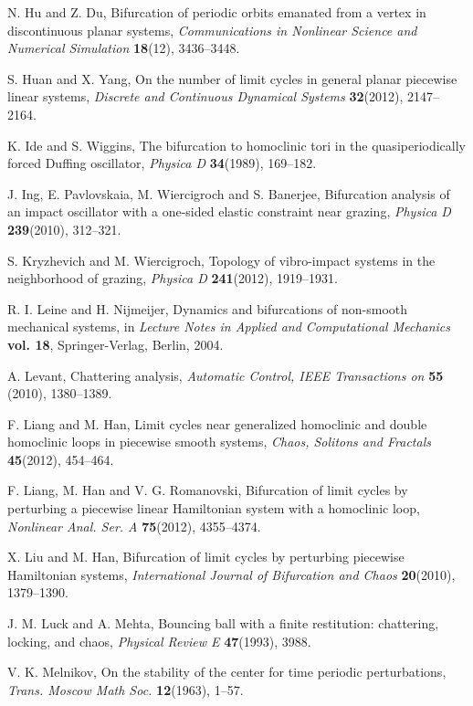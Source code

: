 \documentclass[12pt,openany,CJK,oneside]{cctbook}
\begin{document}
{{\begin{thebibliography}{999}
 N. Hu and Z. Du, Bifurcation of periodic orbits emanated from a vertex in discontinuous planar systems, {\it Communications in Nonlinear Science and Numerical Simulation} {\bf 18}(12), 3436--3448.

S. Huan and X. Yang, On the number of limit cycles in general planar piecewise linear systems, {\it Discrete and Continuous Dynamical Systems} {\bf 32}(2012), 2147--2164.

 K. Ide and S. Wiggins, The bifurcation to homoclinic tori in the quasiperiodically forced
Duffing oscillator, {\it Physica D} {\bf 34}(1989), 169--182.

 J. Ing, E. Pavlovskaia, M. Wiercigroch and S. Banerjee, Bifurcation analysis of an impact
oscillator with a one-sided elastic constraint near grazing, {\it Physica D} {\bf 239}(2010), 312--321.

 S. Kryzhevich and M. Wiercigroch, Topology of vibro-impact systems in the neighborhood of grazing,
{\it Physica D} {\bf 241}(2012), 1919--1931.

  R. I. Leine and H. Nijmeijer, Dynamics and bifurcations of non-smooth mechanical systems, in {\it Lecture Notes in Applied and Computational Mechanics} {\bf vol. 18}, Springer-Verlag, Berlin, 2004.

A. Levant, Chattering analysis, {\it Automatic Control, IEEE Transactions on} {\bf 55} (2010), 1380--1389.

F. Liang and M. Han, Limit cycles near generalized homoclinic and double homoclinic loops in piecewise smooth systems, {\it Chaos, Solitons and Fractals} {\bf 45}(2012), 454--464.

F. Liang, M. Han and V. G. Romanovski, Bifurcation of limit cycles by perturbing a piecewise linear Hamiltonian system with a homoclinic loop, {\it Nonlinear Anal. Ser. A} {\bf 75}(2012), 4355--4374.

 X. Liu and M. Han, Bifurcation of limit cycles by perturbing piecewise Hamiltonian systems, {\it International Journal of Bifurcation and Chaos} {\bf 20}(2010), 1379--1390.

 J. M. Luck and A. Mehta, Bouncing ball with a finite restitution: chattering, locking, and chaos, {\it Physical Review E} {\bf 47}(1993),  3988.

 V. K. Melnikov,
On the stability of the center for time periodic perturbations,
{\it Trans. Moscow Math Soc.} {\bf 12}(1963), 1--57.


\end{thebibliography}}}
\end{document}
